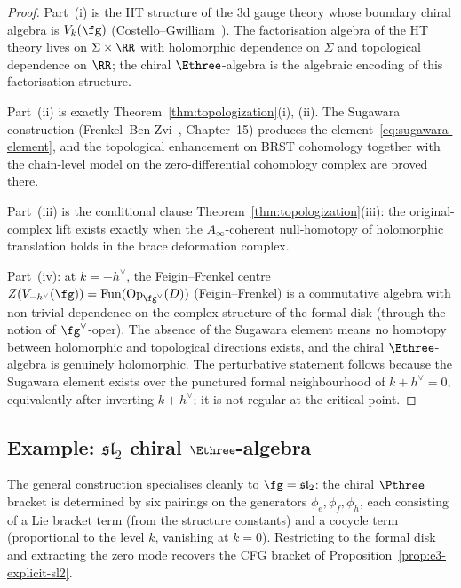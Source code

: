 \begin{proof}
Part~\textup{(i)} is the HT structure of the $3$d gauge theory
whose boundary chiral algebra is $V_k(\fg)$
\textup{(}Costello--Gwilliam~\cite{CG17}\textup{)}.
The factorisation algebra of the HT theory lives on
$\Sigma \times \RR$ with holomorphic dependence on
$\Sigma$ and topological dependence on $\RR$; the chiral
$\Ethree$-algebra is the algebraic encoding of this
factorisation structure.

Part~\textup{(ii)} is exactly
Theorem~\ref{thm:topologization}\textup{(i), (ii)}.
The Sugawara construction
\textup{(}Frenkel--Ben-Zvi~\cite{FBZ04}, Chapter~15\textup{)}
produces the element~\eqref{eq:sugawara-element}, and the
topological enhancement on BRST cohomology together with the
chain-level model on the zero-differential cohomology
complex are proved there.

Part~\textup{(iii)} is the conditional clause
Theorem~\ref{thm:topologization}\textup{(iii)}:
the original-complex lift exists exactly when the
$A_\infty$-coherent null-homotopy of holomorphic translation
holds in the brace deformation complex.

Part~\textup{(iv)}: at $k = -h^\vee$, the Feigin--Frenkel centre
$Z(V_{-h^\vee}(\fg)) = \mathrm{Fun}(\mathrm{Op}_{\fg^\vee}(D))$
(Feigin--Frenkel) is a commutative
algebra with non-trivial dependence on the complex structure
of the formal disk (through the notion of $\fg^\vee$-oper).
The absence of the Sugawara element means no homotopy
between holomorphic and topological directions exists, and
the chiral $\Ethree$-algebra is genuinely holomorphic.
The perturbative statement follows because the Sugawara
element exists over the punctured formal neighbourhood of
$k+h^\vee=0$, equivalently after inverting $k+h^\vee$; it is
not regular at the critical point.
\end{proof}


\subsection{Example: $\mathfrak{sl}_2$ chiral $\Ethree$-algebra}
\label{subsec:sl2-chiral-e3}

The general construction specialises cleanly to
$\fg = \mathfrak{sl}_2$: the chiral $\Pthree$ bracket is
determined by six pairings on the generators
$\phi_e, \phi_f, \phi_h$, each consisting of a Lie bracket
term (from the structure constants) and a cocycle term
(proportional to the level $k$, vanishing at $k = 0$).
Restricting to the formal disk and extracting the zero mode
recovers the CFG bracket of
Proposition~\ref{prop:e3-explicit-sl2}.

